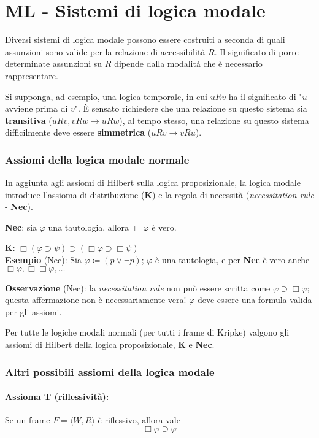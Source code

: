 \chapter{ML - Sistemi di logica modale}

Diversi sistemi di logica modale possono essere costruiti a seconda di quali assunzioni sono valide per la relazione di accessibilità $R$. Il significato di porre determinate assunzioni su $R$ dipende dalla modalità che è necessario rappresentare.

Si supponga, ad esempio, una logica temporale, in cui $uRv$ ha il significato di "$u$ avviene prima di $v$". È sensato richiedere che una relazione su questo sistema sia \textbf{transitiva} ($uRv, vRw \to uRw$), al tempo stesso, una relazione su questo sistema difficilmente deve essere \textbf{simmetrica} ($uRv \to vRu$).

\subsection{Assiomi della logica modale normale}

In aggiunta agli assiomi di Hilbert sulla logica proposizionale, la logica modale introduce l'assioma di distribuzione (\textbf{K}) e la regola di necessità (\textit{necessitation rule} - \textbf{Nec}).

\textbf{Nec}: sia $\varphi$ una tautologia, allora $\Box \varphi$ è vero.

\textbf{K}: $\Box (\varphi \supset \psi) \supset (\Box \varphi \supset \Box \psi)$
\\

\textbf{Esempio} (Nec): Sia $\varphi \coloneqq (p \lor \lnot p)$; $\varphi$ è una tautologia, e per \textbf{Nec} è vero anche $\Box \varphi, \Box \Box \varphi, \dots$

\textbf{Osservazione} (Nec): la \textit{necessitation rule} non può essere scritta come $\varphi \supset \Box \varphi$; questa affermazione non è necessariamente vera! $\varphi$ deve essere una formula valida per gli assiomi.

Per tutte le logiche modali normali (per tutti i frame di Kripke) valgono gli assiomi di Hilbert della logica proposizionale, \textbf{K} e \textbf{Nec}.

\subsection{Altri possibili assiomi della logica modale}

\subsubsection{Assioma T (riflessività):} Se un frame $F = \langle W, R \rangle$ è riflessivo, allora vale $$\Box \varphi \supset \varphi$$

